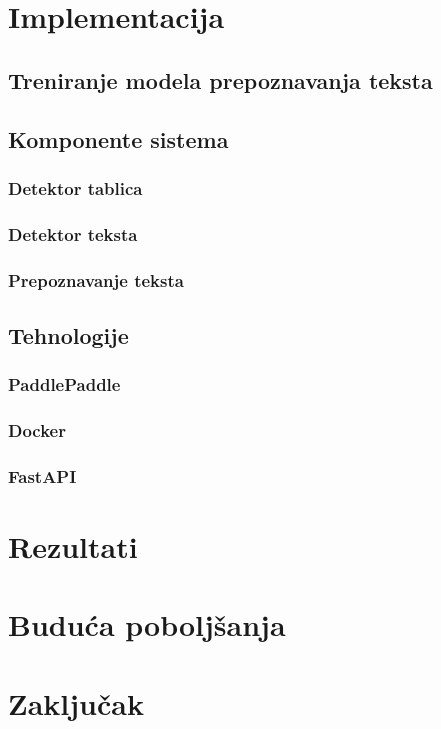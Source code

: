 \documentclass[a4paper,12pt]{article}
\begin{document}
	\section{Implementacija}
	\subsection{Treniranje modela prepoznavanja teksta}
	\subsection{Komponente sistema}
	\subsubsection{Detektor tablica}
	\subsubsection{Detektor teksta}
	\subsubsection{Prepoznavanje teksta}
	\subsection{Tehnologije}
	\subsubsection{PaddlePaddle}
	\subsubsection{Docker}
	\subsubsection{FastAPI}
	\newpage
	
	\section{Rezultati}
	\newpage
	
	\section{Buduća poboljšanja}
	\newpage
	
	\section{Zaključak}
	\newpage
	
	\printbibliography
\end{document}
